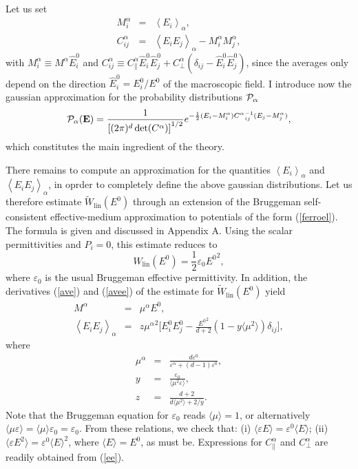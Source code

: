 Let us set
\begin{eqnarray}
M_i^\alpha&=&\left\langle E_i\right\rangle_{\alpha},\\
C^\alpha_{ij}&=&\left\langle E_i E_j\right\rangle_{\alpha}-
M_i^\alpha M_j^\alpha,
\end{eqnarray}
with $M^\alpha_i\equiv M^\alpha \hat{E}^0_i$ and $C^\alpha_{ij}
\equiv C^\alpha_\parallel \hat{E}^0_i\hat{E}^0_j+
C^\alpha_\perp(\delta_{ij}-\hat{E}^0_i\hat{E}^0_j)$, since the
averages only depend on the direction $\hat{E}^0_i=E^0_i/E^0$
of the macroscopic field. I introduce now the gaussian approximation
for the probability distributions ${\cal{P}}_\alpha$
\begin{equation}
\label{pae}
{\cal{P}}_\alpha({\bf E})={1\over \left[(2\pi)^d \det(C^\alpha) \right]^{1/2}} e^{-{1\over 2}(E_i-M^\alpha_i) {C^\alpha}^{-1}_{ij}(E_j-M^\alpha_j)},
\end{equation}
which constitutes the main ingredient of the theory.

There remains to compute an approximation for the quantities
$\left\langle E_i\right\rangle_{\alpha}$ and $\left\langle
E_i E_j\right\rangle_{\alpha}$, in oprder to completely define
the above gaussian distributions. Let us therefore estimate
$\tilde{W}_{\text{lin}}(E^0)$ through an extension of the
Bruggeman self-consistent effective-medium approximation\cite{BRUG35}
to potentials of the form (\ref{ferroel}). The formula is
given and discussed in Appendix A. Using the scalar
permittivities and $P_i=0$, this estimate reduces to
\begin{equation}
W_{\text{lin}}(E^0)=\frac{1}{2}\varepsilon_0 {E^0}^2,
\end{equation}
where $\varepsilon_0$ is the usual Bruggeman effective
permittivity\cite{BRUG35}. In addition, the derivatives
(\ref{ave}) and (\ref{avee}) of the estimate for
$\tilde{W}_{\text{lin}}(E^0)$ yield
\begin{eqnarray}
M^\alpha&=&\mu^\alpha E^0,\\
\label{ee}
\left\langle E_i E_j\right\rangle_\alpha&=&z
{\mu^\alpha}^2\Biggl[E^0_iE^0_j -\frac{{E^0}^2}{d+2}\left(1-y\langle\mu^2 \rangle\right)\delta_{ij}\Biggr],
\end{eqnarray}
where
\begin{eqnarray}
\mu^\alpha&=&\frac{d\varepsilon^0}
{\varepsilon^\alpha+(d-1)\varepsilon^0},\\
y&=&\frac{\varepsilon_0}{\langle\mu^2\varepsilon\rangle},\\
z&=&\frac{d+2}{d\langle\mu^2\rangle+2/y}.
\end{eqnarray}
Note that the Bruggeman equation for $\varepsilon_0$ reads
$\langle\mu\rangle=1$, or alternatively $\langle\mu
\varepsilon\rangle=\langle\mu\rangle\varepsilon_0=\varepsilon_0$.
From these relations, we check that: (i) $\langle\varepsilon
E\rangle=\varepsilon^0 \langle E\rangle$; (ii) $\langle\varepsilon
E^2\rangle=\varepsilon^0 \langle E\rangle^2$, where $\langle
E\rangle=E^0$, as must be. Expressions for $C^\alpha_\parallel$
and $C^\alpha_\perp$ are readily obtained from (\ref{ee}).

